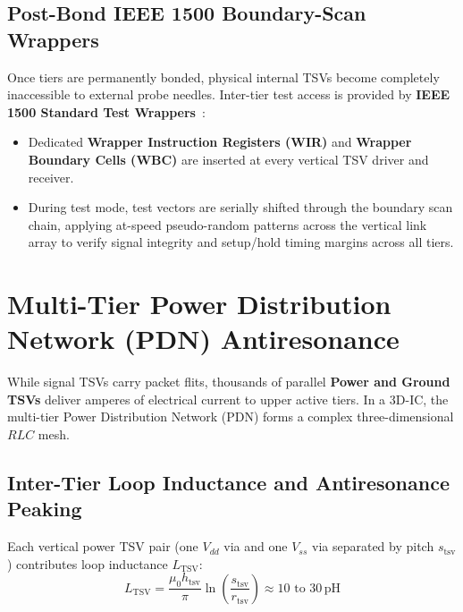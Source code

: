 \subsection{Post-Bond IEEE 1500 Boundary-Scan Wrappers}
Once tiers are permanently bonded, physical internal TSVs become completely inaccessible to external probe needles. Inter-tier test access is provided by \textbf{IEEE 1500 Standard Test Wrappers}~\cite{IEEE1500,Agrawal2014Test}:
\begin{itemize}
    \item Dedicated \textbf{Wrapper Instruction Registers (WIR)} and \textbf{Wrapper Boundary Cells (WBC)} are inserted at every vertical TSV driver and receiver.
    \item During test mode, test vectors are serially shifted through the boundary scan chain, applying at-speed pseudo-random patterns across the vertical link array to verify signal integrity and setup/hold timing margins across all tiers.
\end{itemize}

\section{Multi-Tier Power Distribution Network (PDN) Antiresonance}
\label{sec:ch8_pdn}

While signal TSVs carry packet flits, thousands of parallel \textbf{Power and Ground TSVs} deliver amperes of electrical current to upper active tiers. In a 3D-IC, the multi-tier Power Distribution Network (PDN) forms a complex three-dimensional $RLC$ mesh.

\subsection{Inter-Tier Loop Inductance and Antiresonance Peaking}
Each vertical power TSV pair (one $V_{dd}$ via and one $V_{ss}$ via separated by pitch $s_{\mathrm{tsv}}$) contributes loop inductance $L_{\mathrm{TSV}}$:
\begin{equation}
L_{\mathrm{TSV}} = \frac{\mu_0 h_{\mathrm{tsv}}}{\pi} \ln\left(\frac{s_{\mathrm{tsv}}}{r_{\mathrm{tsv}}}\right) \approx 10\text{ to }30\,\mathrm{pH}
\label{eq:ch8_tsv_inductance}
\end{equation}

